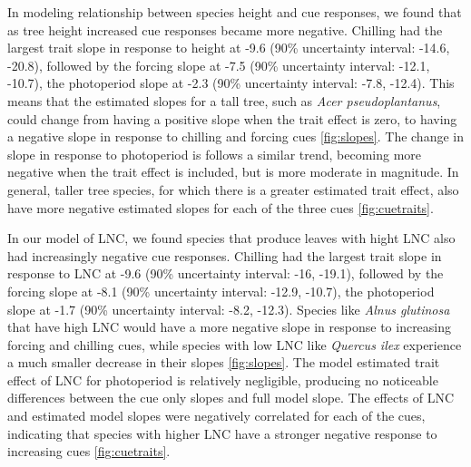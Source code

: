 \documentclass{article}\usepackage[]{graphicx}\usepackage[]{color}
\begin{document}
In modeling relationship between species height and cue responses, we found that as tree height increased cue responses became more negative. Chilling had the largest trait slope in response to height at -9.6 (90\% uncertainty interval: -14.6, -20.8), followed by the forcing slope at -7.5 (90\% uncertainty interval: -12.1, -10.7), the photoperiod slope at -2.3 (90\% uncertainty interval: -7.8, -12.4). This means that the estimated slopes for a tall tree, such as \textit{Acer pseudoplantanus}, could change from having a positive slope when the trait effect is zero, to having a negative slope in response to chilling and forcing cues \ref{fig:slopes}. The change in slope in response to photoperiod is follows a similar trend, becoming more negative when the trait effect is included, but is more moderate in magnitude. In general, taller tree species, for which there is a greater estimated trait effect,  also have more negative estimated slopes for each of the three cues \ref{fig:cuetraits}. 

In our model of LNC, we found species that produce leaves with hight LNC also had increasingly negative cue responses. Chilling had the largest trait slope in response to LNC at -9.6 (90\% uncertainty interval: -16, -19.1), followed by the forcing slope at -8.1 (90\% uncertainty interval: -12.9, -10.7), the photoperiod slope at -1.7 (90\% uncertainty interval: -8.2, -12.3). Species like \textit{Alnus glutinosa} that have high LNC would have a more negative slope in response to increasing forcing and chilling cues, while species with low LNC like \textit{Quercus ilex} experience a much smaller decrease in their slopes \ref{fig:slopes}. The model estimated trait effect of LNC for photoperiod is relatively negligible, producing no noticeable differences between the cue only slopes and full model slope.  The effects of LNC and estimated model slopes were negatively correlated for each of the cues, indicating that species with higher LNC have a stronger negative response to increasing cues \ref{fig:cuetraits}. 
\end{document}
